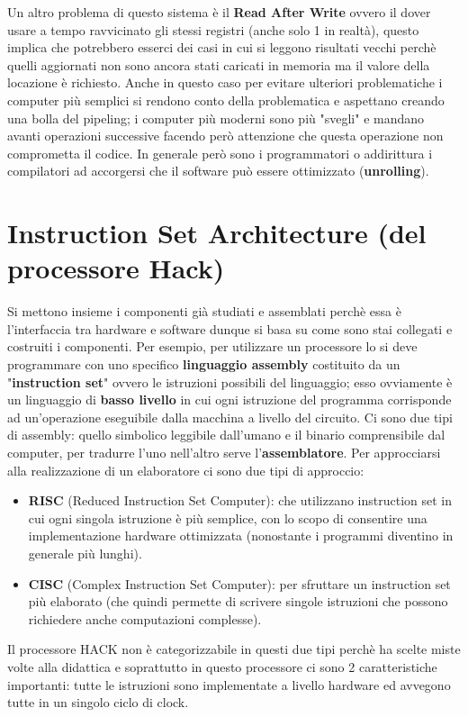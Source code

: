 \documentclass{article}
\begin{document}
Un altro problema di questo sistema è il \textbf{Read After Write} ovvero il dover usare a tempo ravvicinato gli stessi registri (anche solo 1 in realtà), questo implica che potrebbero esserci dei casi in cui si leggono risultati vecchi perchè quelli aggiornati non sono ancora stati caricati in memoria ma il valore della locazione è richiesto. Anche in questo caso per evitare ulteriori problematiche i computer più semplici si rendono conto della problematica e aspettano creando una bolla del pipeling; i computer più moderni sono più "svegli" e mandano avanti operazioni successive facendo però attenzione che questa operazione non comprometta il codice. In generale però sono i programmatori o addirittura i compilatori ad accorgersi che il software può essere ottimizzato (\textbf{unrolling}).

\section{Instruction Set Architecture (del processore Hack)}
Si mettono insieme i componenti già studiati e assemblati perchè essa è l'interfaccia tra hardware e software dunque si basa su come sono stai collegati e costruiti i componenti. Per esempio, per utilizzare un processore lo si deve programmare con uno specifico \textbf{linguaggio assembly} costituito da un "\textbf{instruction set}" ovvero le istruzioni possibili del linguaggio; esso ovviamente è un linguaggio di \textbf{basso livello} in cui ogni istruzione del programma corrisponde ad un'operazione eseguibile dalla macchina a livello del circuito. Ci sono due tipi di assembly: quello simbolico leggibile dall'umano e il binario comprensibile dal computer, per tradurre l'uno nell'altro serve l'\textbf{assemblatore}. Per approcciarsi alla realizzazione di un elaboratore ci sono due tipi di approccio:
\begin{itemize}
    \item \textbf{RISC} (Reduced Instruction Set Computer): che utilizzano instruction set in cui ogni singola istruzione è più semplice, con lo scopo di consentire una implementazione hardware ottimizzata (nonostante i programmi diventino in generale più lunghi).
    \item \textbf{CISC} (Complex Instruction Set Computer): per sfruttare un instruction set più elaborato (che quindi permette di scrivere singole istruzioni che possono richiedere anche computazioni complesse).
\end{itemize}

Il processore HACK non è categorizzabile in questi due tipi perchè ha scelte miste volte alla didattica e soprattutto in questo processore ci sono 2 caratteristiche importanti: tutte le istruzioni sono implementate a livello hardware ed avvegono tutte in un singolo ciclo di clock.
\end{document}
